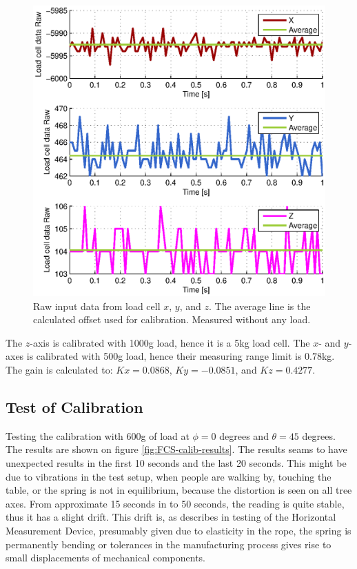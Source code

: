 \begin{figure}[hbtp]
\centering
\includegraphics[scale=1]{graphics/fcs_test/fcs_calib.eps}
\caption[Raw input data from load cell $x$, $y$, and $z$.]{Raw input data from load cell $x$, $y$, and $z$. The average line is the calculated offset used for calibration. Measured without any load.}
\label{fig:fcs-calib-offset}
\end{figure}

\noindent
The $z$-axis is calibrated with 1000g load, hence it is a 5kg load cell. The $x$- and $y$-axes is calibrated with 500g load, hence their measuring range limit is $0.78$kg. The gain is calculated to: $Kx=0.0868$, $Ky=-0.0851$, and $Kz=0.4277$. 
\\


\subsection{Test of Calibration}
Testing the calibration with 600g of load at $\phi=0$ degrees and $\theta=45$ degrees. The results are shown on figure \ref{fig:FCS-calib-results}. The results seams to have unexpected results in the first 10 seconds and the last 20 seconds. This might be due to vibrations in the test setup, when people are walking by, touching the table, or the spring is not in equilibrium, because the distortion is seen on all tree axes. From approximate 15 seconds in to 50 seconds, the reading is quite stable, thus it has a slight drift. This drift is, as describes in testing of the Horizontal Measurement Device, presumably given due to elasticity in the rope, the spring is permanently bending or tolerances in the manufacturing process gives rise to small displacements of mechanical components.\\
\\

